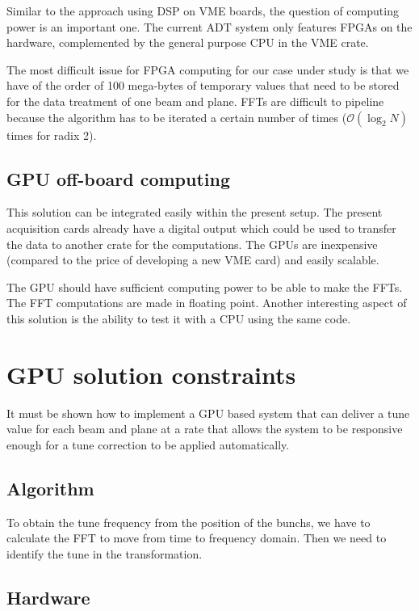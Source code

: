 Similar to the approach using \gls{DSP} on VME boards, the question of computing power is an important one. The current \gls{ADT} system only features \glspl{FPGA} on the hardware, complemented by the general purpose \gls{CPU} in the \gls{VME} crate.

The most difficult issue for \gls{FPGA} computing for our case under study is that we have of the order of 100 mega-bytes of temporary values that need to be stored for the data treatment of one beam and plane. \Glspl{FFT} are difficult to pipeline because the algorithm has to be iterated a certain number of times ($\mathcal{O}(\log_{2} N)$ times for radix 2).

\subsection{GPU off-board computing}

This solution can be integrated easily within the present setup. The present acquisition cards already have a digital output which could be used to transfer the data to another crate for the computations. The \glspl{GPU} are inexpensive (compared to the price of developing a new \gls{VME} card) and easily scalable. 

The \gls{GPU} should have sufficient computing power to be able to make the \glspl{FFT}. The \gls{FFT} computations are made in floating point. Another interesting aspect of this solution is the ability to test it with a \gls{CPU} using the same code.

\section{GPU solution constraints}

It must be shown how to implement a GPU based system that can deliver a tune value for each beam and plane at a rate that allows the system to be responsive enough for a tune correction to be applied automatically.

\subsection{Algorithm}

To obtain the tune frequency from the position of the \glspl{bunch}, we have to calculate the FFT to move from time to frequency domain. Then we need to identify the tune in the transformation.

\subsection{Hardware}

